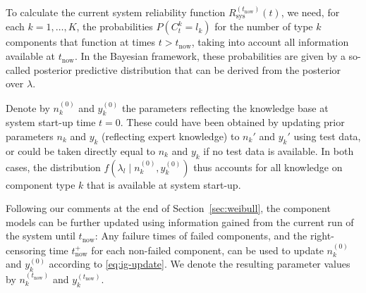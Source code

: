 \documentclass[authoryear]{elsarticle}
\newcommand{\uz}{^{(0)}} %
\def\ykz{y\uz_k}
\def\nkz{n\uz_k}
\def\yknow{y_k^{(\tnow)}}
\def\nknow{n_k^{(\tnow)}}
\newcommand{\nk}{n_k}
\newcommand{\nkp}{n_k'}
\newcommand{\yk}{y_k}
\newcommand{\ykp}{y_k'}
\def\tnow{t_\text{now}}
\def\tpnow{t^+_\text{now}}
\newcommand{\Rsysnow}{R^{(t_\text{now})}_\text{sys}}
\begin{document}
To calculate the current system reliability function $\Rsysnow(t)$,
we need, for each $k=1,\ldots, K$, the probabilities $P(C^k_t = l_k)$
for the number of type $k$ components that function at times $t > \tnow$,
taking into account all information available at $\tnow$.
In the Bayesian framework, these probabilities are given
by a so-called posterior predictive distribution that can be derived from the posterior over $\lambda$.

Denote by $\nkz$ and $\ykz$ the parameters reflecting the knowledge base at system start-up time $t=0$.
These could have been obtained by updating prior parameters $\nk$ and $\yk$ (reflecting expert knowledge)
to $\nkp$ and $\ykp$ using test data,
or could be taken directly equal to $\nk$ and $\yk$ if no test data is available.
In both cases, the distribution $f(\lambda_l \mid \nkz, \ykz)$
thus accounts for all knowledge on component type $k$ that is available at system start-up.

Following our comments at the end of Section~\ref{sec:weibull},
the component models can be further updated
using information gained from the current run of the system until $\tnow$:
Any failure times of failed components,
and the right-censoring time $\tpnow$ for each non-failed component,
can be used to update $\nkz$ and $\ykz$ according to \eqref{eq:ig-update}.
We denote the resulting parameter values by $\nknow$ and $\yknow$.
\end{document}
